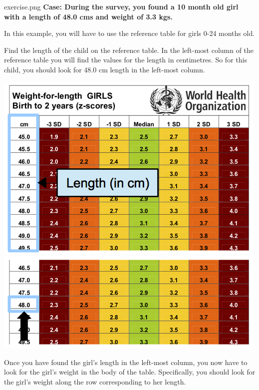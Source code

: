 \documentclass[
  12pt,
]{book}
\newenvironment{rmdexercise}
  {\begin{tcolorbox}[width=\textwidth, 
                     colback = {white}, 
                     title = {\textbf{Exercise}}, 
                     colbacktitle = lightgray,
                     coltitle = black]
  \begin{includegraphics}[scale = 1]{exercise.png}}
  {\end{includegraphics}
  \end{tcolorbox}}
\begin{document}
\begin{rmdexercise}
\textbf{Case: During the survey, you found a 10 month old girl with a length of 48.0 cms and weight of 3.3 kgs.}

In this example, you will have to use the reference table for girls 0-24 months old.

Find the length of the child on the reference table. In the left-most column of the reference table you will find the values for the length in centimetres. So for this child, you should look for 48.0 cm length in the left-most column.

\includegraphics{images/whzRefTable01.png} \includegraphics{images/whzRefTable01a.png}

Once you have found the girl's length in the left-most column, you now have to look for the girl's weight in the body of the table. Specifically, you should look for the girl's weight along the row corresponding to her length.


\end{rmdexercise}
\end{document}
